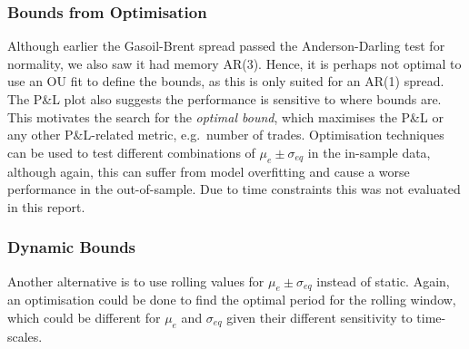 \documentclass[11pt]{article}
\begin{document}
    \subsubsection{Bounds from Optimisation}\label{bounds-from-optimisation}
Although earlier the Gasoil-Brent spread passed the Anderson-Darling
test for normality, we also saw it had memory AR(3). Hence, it is
perhaps not optimal to use an OU fit to define the bounds, as this is
only suited for an AR(1) spread. The P\&L plot also suggests the
performance is sensitive to where bounds are. This motivates the search
for the \emph{optimal bound}, which maximises the P\&L or any other
P\&L-related metric, e.g.~number of trades. Optimisation techniques can
be used to test different combinations of \(\mu_e \pm \sigma_{eq}\) in
the in-sample data, although again, this can suffer from model
overfitting and cause a worse performance in the out-of-sample. Due to
time constraints this was not evaluated in this report.
    \subsubsection{Dynamic Bounds}\label{dynamic-bounds}
Another alternative is to use rolling values for
\(\mu_e \pm \sigma_{eq}\) instead of static. Again, an optimisation
could be done to find the optimal period for the rolling window,
which could be different for \(\mu_e\) and \(\sigma_{eq}\) given their
different sensitivity to time-scales.
    
    
\newpage
\end{document}
